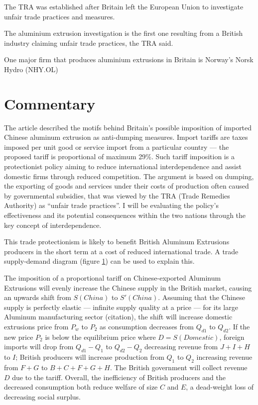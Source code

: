 \documentclass[a4paper,12pt]{article}
\newcommand{\tikzfig}[1]{}
\begin{document}
The TRA was established after Britain left the European Union to investigate unfair trade practices and measures.

The aluminium extrusion investigation is the first one resulting from a British industry claiming unfair trade practices, the TRA said.

One major firm that produces aluminium extrusions in Britain is Norway's Norsk Hydro (NHY.OL)

\newpage
\section*{Commentary}


The article described the motifs behind Britain's possible imposition of imported Chinese aluminum extrusion as anti-dumping measures. Import tariffs are taxes imposed per unit good or service import from a particular country --- the proposed tariff is proportional of maximum 29\%. Such tariff imposition is a protectionist policy aiming to reduce international interdependence and assist domestic firms through reduced competition. The argument is based on dumping, the exporting of goods and services under their costs of production often caused by governmental subsidies, that was viewed by the TRA (Trade Remedies Authority) as ``unfair trade practices''. I will be evaluating the policy's effectiveness and its potential consequences within the two nations through the key concept of interdependence.

This trade protectionism is likely to benefit British Aluminum Extrusions producers in the short term at a cost of reduced international trade. A trade supply-demand diagram (figure \ref{fig:tariff}) can be used to explain this.

\begin{figure}[H]
	\centering
	 \tikzfig{assets/tariffs.txt}
	\caption{}
	\label{fig:tariff}
\end{figure}

The imposition of a proportional tariff on Chinese-exported Aluminum Extrusions will evenly increase the Chinese supply in the British market, causing an upwards shift from $S(China)$ to $S'(China)$. Assuming that the Chinese supply is perfectly elastic --- infinite supply quality at a price --- for its large Aluminum manufacturing sector (citation), the shift will increase domestic extrusions price from $P_w$ to $P_2$ as consumption decreases from $Q_{d1}$ to $Q_{d2}$. If the new price $P_2$ is below the equilibrium price where $D=S(Domestic)$, foreign imports will drop from $Q_{d1}-Q_{1}$ to $Q_{d2}-Q_{2}$ decreasing revenue from $J+I+H$ to $I$; British producers will increase production from $Q_1$ to $Q_2$ increasing revenue from $F+G$ to $B+C+F+G+H$. The British government will collect revenue $D$ due to the tariff. Overall, the inefficiency of British producers and the decreased consumption both reduce welfare of size $C$ and $E$, a dead-weight loss of decreasing social surplus.
\end{document}
